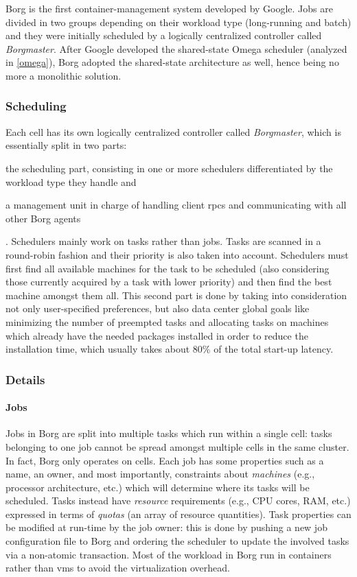 Borg \cite{borg} is the first container-management system developed by Google.
Jobs are divided in two groups depending on their workload type (long-running and batch) and they were initially scheduled by a logically centralized controller called \textit{Borgmaster}.
After Google developed the shared-state Omega \cite{omega} scheduler (analyzed in \autoref{omega}), Borg \cite{borg} adopted the shared-state architecture as well, hence being no more a monolithic solution.

\subsubsection{Scheduling}
Each cell has its own logically centralized controller called \textit{Borgmaster}, which is essentially split in two parts:
\begin{mylist}
    \item the scheduling part, consisting in one or more schedulers differentiated by the workload type they handle and
    \item a management unit in charge of handling client \glspl{rpc} and communicating with all other Borg \cite{borg} agents
\end{mylist}.
Schedulers mainly work on tasks rather than jobs.
Tasks are scanned in a round-robin fashion and their priority is also taken into account.
Schedulers must first find all available machines for the task to be scheduled (also considering those currently acquired by a task with lower priority) and then find the best machine amongst them all.
This second part is done by taking into consideration not only user-specified preferences, but also data center global goals like minimizing the number of preempted tasks and allocating tasks on machines which already have the needed packages installed in order to reduce the installation time, which usually takes about 80\% of the total start-up latency.

\subsubsection{Details}

\paragraph{Jobs}
Jobs in Borg \cite{borg} are split into multiple tasks which run within a single cell: tasks belonging to one job cannot be spread amongst multiple cells in the same cluster.
In fact, Borg \cite{borg} only operates on cells.
Each job has some properties such as a name, an owner, and most importantly, constraints about \textit{machines} (e.g., processor architecture, etc.) which will determine where its tasks will be scheduled.
Tasks instead have \textit{resource} requirements (e.g., CPU cores, RAM, etc.) expressed in terms of \textit{quotas} (an array of resource quantities).
Task properties can be modified at run-time by the job owner: this is done by pushing a new job configuration file to Borg \cite{borg} and ordering the scheduler to update the involved tasks via a non-atomic transaction.
Most of the workload in Borg \cite{borg} run in containers rather than \glspl{vm} to avoid the virtualization overhead.

